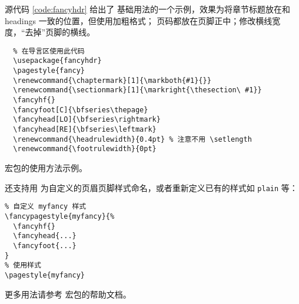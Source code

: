 源代码 \ref{code:fancyhdr} 给出了  基础用法的一个示例，效果为将章节标题放在和 headings 一致的位置，但使用加粗格式；
页码都放在页脚正中；修改横线宽度，“去掉”页脚的横线。

\begin{sourcecode}[htp]
  \begin{Verbatim}
  % 在导言区使用此代码
  \usepackage{fancyhdr}
  \pagestyle{fancy}
  \renewcommand{\chaptermark}[1]{\markboth{#1}{}}
  \renewcommand{\sectionmark}[1]{\markright{\thesection\ #1}}
  \fancyhf{}
  \fancyfoot[C]{\bfseries\thepage}
  \fancyhead[LO]{\bfseries\rightmark}
  \fancyhead[RE]{\bfseries\leftmark}
  \renewcommand{\headrulewidth}{0.4pt} % 注意不用 \setlength
  \renewcommand{\footrulewidth}{0pt}
  \end{Verbatim}
  \caption{ 宏包的使用方法示例。}\label{code:fancyhdr}
\end{sourcecode}

 还支持用  为自定义的页眉页脚样式命名，或者重新定义已有的样式如 \texttt{plain} 等：
\begin{verbatim}
% 自定义 myfancy 样式
\fancypagestyle{myfancy}{%
  \fancyhf{}
  \fancyhead{...}
  \fancyfoot{...}
}
% 使用样式
\pagestyle{myfancy}
\end{verbatim}

更多用法请参考  宏包的帮助文档。


\endinput
